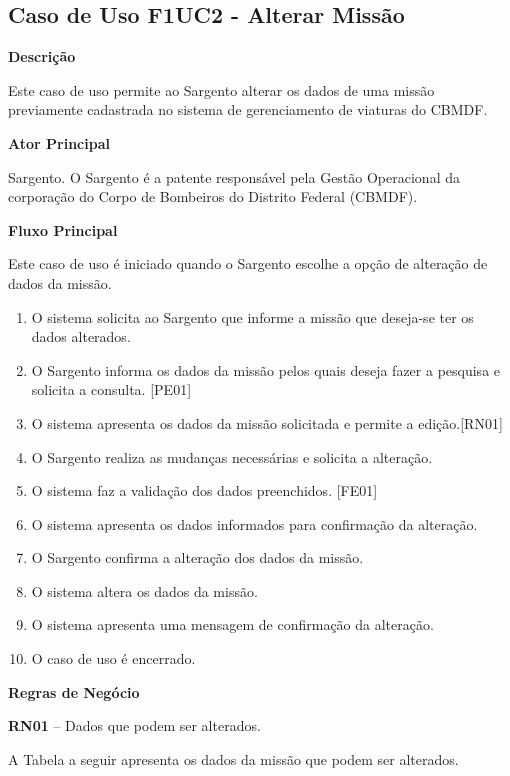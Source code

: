   \subsection{Caso de Uso F1UC2 - Alterar Missão}

  {\raggedright
      \textbf{Descrição}
  }
  
    Este caso de uso permite ao Sargento alterar os dados de uma missão previamente cadastrada no sistema de gerenciamento de viaturas do CBMDF.

  {\raggedright
      \textbf{Ator Principal}
  }

    Sargento. O Sargento é a patente responsável pela Gestão Operacional da corporação do Corpo de Bombeiros do Distrito Federal (CBMDF).
  
  {\raggedright
      \textbf{Fluxo Principal}
  }
  
    Este caso de uso é iniciado quando o Sargento escolhe a opção de alteração de dados da missão.
    
  \begin{enumerate}
  \item O sistema solicita ao Sargento que informe a missão que deseja-se ter os dados alterados.
  \item O Sargento informa os dados da missão pelos quais deseja fazer a pesquisa e solicita a consulta. [PE01]
  \item O sistema apresenta os dados da missão solicitada e permite a edição.[RN01]
  \item O Sargento realiza as mudanças necessárias e solicita a alteração.
  \item O sistema faz a validação dos dados preenchidos.  [FE01]
  \item O sistema apresenta os dados informados para confirmação da alteração.
  \item O Sargento confirma a alteração dos dados da missão.
  \item O sistema altera os dados da missão.
  \item O sistema apresenta uma mensagem de confirmação da alteração.
  \item O caso de uso é encerrado.
  \end{enumerate}
  
  \pagebreak
  
   {\raggedright
      \textbf{Regras de Negócio}
   }
   
   \textbf{RN01} – Dados que podem ser alterados.
   
   A Tabela a seguir apresenta os dados da missão que podem ser alterados.
   
